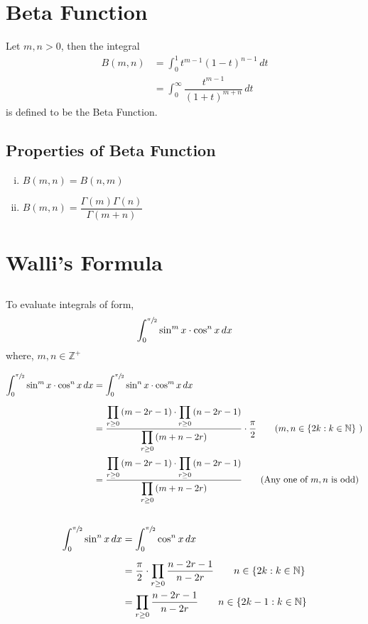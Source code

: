 \documentclass{article}
\begin{document}
\section{Beta Function}
Let $m,n >0$, then the integral \begin{equation*}
    \begin{split}
        B(m,n)&=\displaystyle\int_{0}^{1} t^{m-1}\left(1-t\right)^{n-1} \, dt\\[2mm]
        &=\displaystyle\int_{0}^{\infty} \dfrac{t^{m-1}}{\left(1+t\right)^{m+n}}  \, dt
    \end{split}
\end{equation*}
is defined to be the Beta Function.
\subsection{Properties of Beta Function}
\begin{enumerate}[i.]
    \item $B(m,n)=B(n,m)$
    \item $B(m,n)=\dfrac{\Gamma \left(m\right) \Gamma \left(n\right)}{\Gamma \left(m+n\right)} $
\end{enumerate}
\section{Walli's Formula}
\subsection{}
To evaluate integrals of form, $$\displaystyle\int_{0}^{\sfrac{\pi}{2} } \sin^m x \cdot \cos^n x \, dx $$
where, $m,n \in \mathbb{Z^+}$

    \begin{align*}
        \displaystyle\int_{0}^{\sfrac{\pi}{2}} \sin^m x \cdot \cos^n x  \, dx&=\displaystyle\int_{0}^{\sfrac{\pi}{2}} \sin^n x \cdot \cos^m x \, dx  \\[2mm]
        &=\dfrac{\displaystyle\prod_{r\ge 0} \left(m-2r-1\right) \cdot \displaystyle\prod_{r\ge 0} \left(n-2r-1\right)}{\displaystyle\prod_{r\ge 0}  \left(m+n-2r\right)} \cdot \dfrac{\pi}{2} \tag{$m,n \in {\left\{2k:k \in \mathbb{N}\right\}}$ }\\
        &= \dfrac{\displaystyle\prod_{r\ge 0}  \left(m-2r-1\right) \cdot \displaystyle\prod_{r\ge 0} \left(n-2r-1\right)}{\displaystyle\prod_{r\ge 0}  \left(m+n-2r\right)} \tag{Any one of $m,n$ is odd}
    \end{align*}
\subsection{}
\begin{align*}
    \displaystyle\int_{0}^{\sfrac{\pi}{2}} \sin^n x \, dx&=\displaystyle\int_{0}^{\sfrac{\pi}{2}}\cos^n x \, dx  \\[2mm]
    &= \dfrac{\pi}{2} \cdot  \displaystyle\prod_{r\ge 0} \dfrac{n-2r-1}{n-2r}  \tag*{$n \in \left\{2k:k\in \mathbb{N}\right\}$}\\
    &= \displaystyle\prod_{r\ge 0} \dfrac{n-2r-1}{n-2r} \tag*{$n \in \left\{2k-1:k\in \mathbb{N}\right\}$}
\end{align*}
\end{document}
